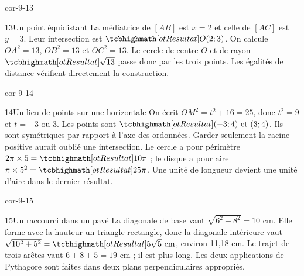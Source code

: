 \begin{blocLivre}{cor-9-13}
\begin{corrige}{13}{Un point équidistant}
La médiatrice de $[AB]$ est $x=2$ et celle de $[AC]$ est $y=3$. Leur intersection est $\res{O(2;3)}$. On calcule $OA^2=13$, $OB^2=13$ et $OC^2=13$. Le cercle de centre $O$ et de rayon $\res{\sqrt{13}}$ passe donc par les trois points. Les égalités de distance vérifient directement la construction.
\label{fig-cor-9-13}
\end{corrige}
\end{blocLivre}
\begin{blocLivre}{cor-9-14}
\begin{corrige}{14}{Un lieu de points sur une horizontale}
On écrit $OM^2=t^2+16=25$, donc $t^2=9$ et $t=-3$ ou 3. Les points sont $\res{(-3;4)\text{ et }(3;4)}$. Ils sont symétriques par rapport à l’axe des ordonnées. Garder seulement la racine positive aurait oublié une intersection. Le cercle a pour périmètre $2\pi\times5=\res{10\pi}$ ; le disque a pour aire $\pi\times5^2=\res{25\pi}$. Une unité de longueur devient une unité d’aire dans le dernier résultat.
\label{fig-cor-9-14}
\end{corrige}
\end{blocLivre}
\begin{blocLivre}{cor-9-15}
\begin{corrige}{15}{Un raccourci dans un pavé}
La diagonale de base vaut $\sqrt{6^2+8^2}=10$ cm. Elle forme avec la hauteur un triangle rectangle, donc la diagonale intérieure vaut $\sqrt{10^2+5^2}=\res{5\sqrt5\text{ cm}}$, environ 11,18 cm. Le trajet de trois arêtes vaut $6+8+5=19$ cm ; il est plus long. Les deux applications de Pythagore sont faites dans deux plans perpendiculaires appropriés.
\label{fig-cor-9-15}
\end{corrige}
\end{blocLivre}
